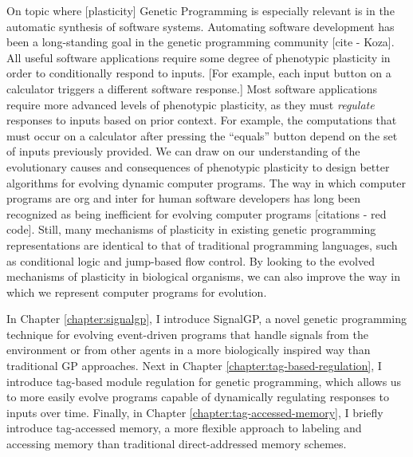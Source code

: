 On topic where [plasticity] Genetic Programming is especially relevant is in the automatic synthesis of software systems.
Automating software development has been a long-standing goal in the genetic programming community [cite - Koza].
All useful software applications require some degree of phenotypic plasticity in order to conditionally respond to inputs.
[For example, each input button on a calculator triggers a different software response.]
Most software applications require more advanced levels of phenotypic plasticity, as they must \textit{regulate} responses to inputs based on prior context.
For example, the computations that must occur on a calculator after pressing the ``equals'' button depend on the set of inputs previously provided.
We can draw on our understanding of the evolutionary causes and consequences of phenotypic plasticity to design better algorithms for evolving dynamic computer programs.
The way in which computer programs are org and inter for human software developers has long been recognized as being inefficient for evolving computer programs [citations - red code].
Still, many mechanisms of plasticity in existing genetic programming representations are identical to that of traditional programming languages, such as conditional logic and jump-based flow control.
By looking to the evolved mechanisms of plasticity in biological organisms, we can also improve the way in which we represent computer programs for evolution.

In Chapter \ref{chapter:signalgp}, I introduce SignalGP, a novel genetic programming technique for evolving event-driven programs that handle signals from the environment or from other agents in a more biologically inspired way than traditional GP approaches.
Next in Chapter \ref{chapter:tag-based-regulation}, I introduce tag-based module regulation for genetic programming, which allows us to more easily evolve programs capable of dynamically regulating responses to inputs over time.
Finally, in Chapter \ref{chapter:tag-accessed-memory}, I briefly introduce tag-accessed memory, a more flexible approach to labeling and accessing memory than traditional direct-addressed memory schemes.

